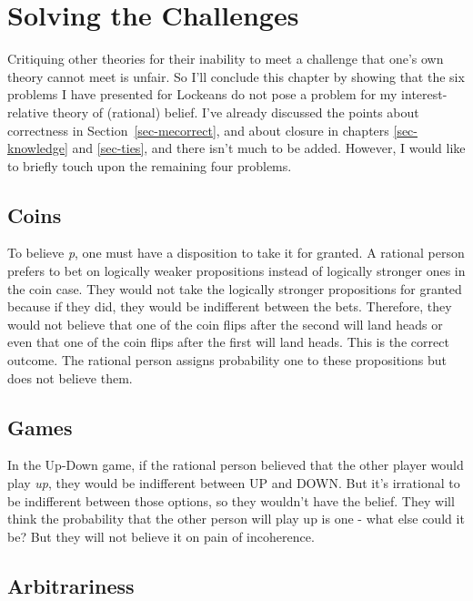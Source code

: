 \documentclass[
  10pt,
  letterpaper,
  twoside]{scrbook}
\begin{document}
\section{Solving the Challenges}\label{sec-solving}

Critiquing other theories for their inability to meet a challenge that
one's own theory cannot meet is unfair. So I'll conclude this chapter by
showing that the six problems I have presented for Lockeans do not pose
a problem for my interest-relative theory of (rational) belief. I've
already discussed the points about correctness in
Section~\ref{sec-mecorrect}, and about closure in chapters
\ref{sec-knowledge} and \ref{sec-ties}, and there isn't much to be
added. However, I would like to briefly touch upon the remaining four
problems.

\subsection{Coins}\label{coins}

To believe \emph{p}, one must have a disposition to take it for granted.
A rational person prefers to bet on logically weaker propositions
instead of logically stronger ones in the coin case. They would not take
the logically stronger propositions for granted because if they did,
they would be indifferent between the bets. Therefore, they would not
believe that one of the coin flips after the second will land heads or
even that one of the coin flips after the first will land heads. This is
the correct outcome. The rational person assigns probability one to
these propositions but does not believe them.

\subsection{Games}\label{games}

In the Up-Down game, if the rational person believed that the other
player would play \emph{up}, they would be indifferent between UP and
DOWN. But it's irrational to be indifferent between those options, so
they wouldn't have the belief. They will think the probability that the
other person will play up is one - what else could it be? But they will
not believe it on pain of incoherence.

\subsection{Arbitrariness}\label{arbitrariness}
\end{document}
